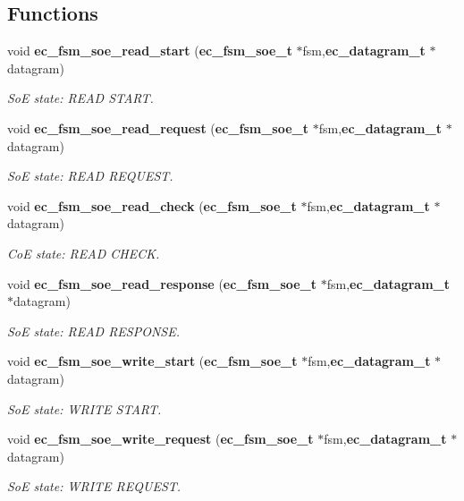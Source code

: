 \subsection*{Functions}
\begin{DoxyCompactItemize}
\item 
void {\bf ec\-\_\-fsm\-\_\-soe\-\_\-read\-\_\-start} ({\bf ec\-\_\-fsm\-\_\-soe\-\_\-t} $\ast$fsm,{\bf ec\-\_\-datagram\-\_\-t} $\ast$datagram)
\begin{DoxyCompactList}\small\item\em So\-E state\-: R\-E\-A\-D S\-T\-A\-R\-T. \end{DoxyCompactList}\item 
void {\bf ec\-\_\-fsm\-\_\-soe\-\_\-read\-\_\-request} ({\bf ec\-\_\-fsm\-\_\-soe\-\_\-t} $\ast$fsm,{\bf ec\-\_\-datagram\-\_\-t} $\ast$datagram)
\begin{DoxyCompactList}\small\item\em So\-E state\-: R\-E\-A\-D R\-E\-Q\-U\-E\-S\-T. \end{DoxyCompactList}\item 
void {\bf ec\-\_\-fsm\-\_\-soe\-\_\-read\-\_\-check} ({\bf ec\-\_\-fsm\-\_\-soe\-\_\-t} $\ast$fsm,{\bf ec\-\_\-datagram\-\_\-t} $\ast$datagram)
\begin{DoxyCompactList}\small\item\em Co\-E state\-: R\-E\-A\-D C\-H\-E\-C\-K. \end{DoxyCompactList}\item 
void {\bf ec\-\_\-fsm\-\_\-soe\-\_\-read\-\_\-response} ({\bf ec\-\_\-fsm\-\_\-soe\-\_\-t} $\ast$fsm,{\bf ec\-\_\-datagram\-\_\-t} $\ast$datagram)
\begin{DoxyCompactList}\small\item\em So\-E state\-: R\-E\-A\-D R\-E\-S\-P\-O\-N\-S\-E. \end{DoxyCompactList}\item 
void {\bf ec\-\_\-fsm\-\_\-soe\-\_\-write\-\_\-start} ({\bf ec\-\_\-fsm\-\_\-soe\-\_\-t} $\ast$fsm,{\bf ec\-\_\-datagram\-\_\-t} $\ast$datagram)
\begin{DoxyCompactList}\small\item\em So\-E state\-: W\-R\-I\-T\-E S\-T\-A\-R\-T. \end{DoxyCompactList}\item 
void {\bf ec\-\_\-fsm\-\_\-soe\-\_\-write\-\_\-request} ({\bf ec\-\_\-fsm\-\_\-soe\-\_\-t} $\ast$fsm,{\bf ec\-\_\-datagram\-\_\-t} $\ast$datagram)
\begin{DoxyCompactList}\small\item\em So\-E state\-: W\-R\-I\-T\-E R\-E\-Q\-U\-E\-S\-T. \end{DoxyCompactList}\item 

\end{DoxyCompactItemize}

